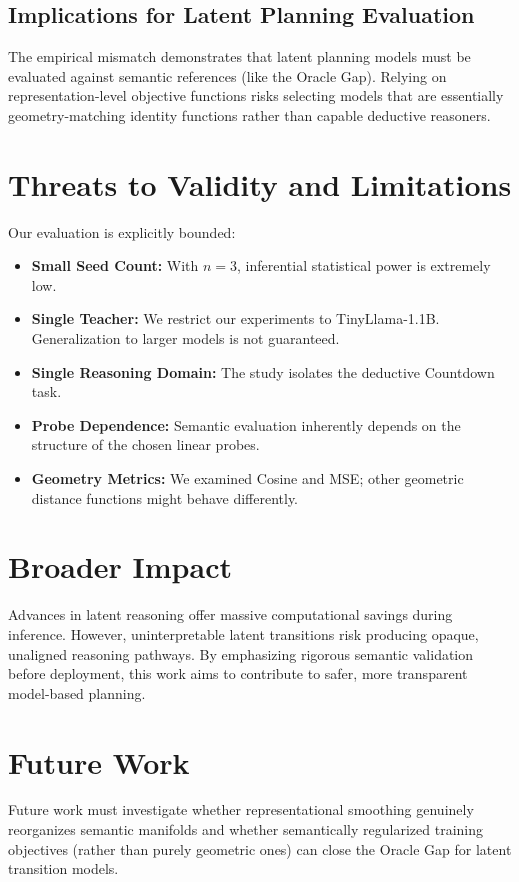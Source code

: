 \documentclass[conference]{IEEEtran}
\begin{document}
\subsection{Implications for Latent Planning Evaluation}
The empirical mismatch demonstrates that latent planning models must be evaluated against semantic references (like the Oracle Gap). Relying on representation-level objective functions risks selecting models that are essentially geometry-matching identity functions rather than capable deductive reasoners.

\section{Threats to Validity and Limitations}
Our evaluation is explicitly bounded:
\begin{itemize}
    \item \textbf{Small Seed Count:} With $n=3$, inferential statistical power is extremely low.
    \item \textbf{Single Teacher:} We restrict our experiments to TinyLlama-1.1B. Generalization to larger models is not guaranteed.
    \item \textbf{Single Reasoning Domain:} The study isolates the deductive Countdown task.
    \item \textbf{Probe Dependence:} Semantic evaluation inherently depends on the structure of the chosen linear probes.
    \item \textbf{Geometry Metrics:} We examined Cosine and MSE; other geometric distance functions might behave differently.
\end{itemize}

\section{Broader Impact}
Advances in latent reasoning offer massive computational savings during inference. However, uninterpretable latent transitions risk producing opaque, unaligned reasoning pathways. By emphasizing rigorous semantic validation before deployment, this work aims to contribute to safer, more transparent model-based planning.

\section{Future Work}
Future work must investigate whether representational smoothing genuinely reorganizes semantic manifolds and whether semantically regularized training objectives (rather than purely geometric ones) can close the Oracle Gap for latent transition models.
\end{document}
